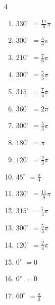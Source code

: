 \begin{multicols}{4}
\begin{enumerate}
  \item $\displaystyle 330^{\circ}$
        $\displaystyle =\frac{11}{6}\pi$

  \item $\displaystyle 300^{\circ}$
        $\displaystyle =\frac{5}{3}\pi$

  \item $\displaystyle 210^{\circ}$
        $\displaystyle =\frac{7}{6}\pi$

  \item $\displaystyle 300^{\circ}$
        $\displaystyle =\frac{5}{3}\pi$

\columnbreak %

  \item $\displaystyle 315^{\circ}$
        $\displaystyle =\frac{7}{4}\pi$

  \item $\displaystyle 360^{\circ}$
        $\displaystyle =2\pi$

  \item $\displaystyle 300^{\circ}$
        $\displaystyle =\frac{5}{3}\pi$

  \item $\displaystyle 180^{\circ}$
        $\displaystyle =\pi$

  \item $\displaystyle 120^{\circ}$
        $\displaystyle =\frac{2}{3}\pi$

  \item $\displaystyle 45^{\circ}$
        $\displaystyle =\frac{\pi}{4}$

  \item $\displaystyle 330^{\circ}$
        $\displaystyle =\frac{11}{6}\pi$

  \item $\displaystyle 315^{\circ}$
        $\displaystyle =\frac{7}{4}\pi$

  \item $\displaystyle 300^{\circ}$
        $\displaystyle =\frac{5}{3}\pi$

  \item $\displaystyle 120^{\circ}$
        $\displaystyle =\frac{2}{3}\pi$

  \item $\displaystyle 0^{\circ}$
        $\displaystyle =0$

  \item $\displaystyle 0^{\circ}$
        $\displaystyle =0$

  \item $\displaystyle 60^{\circ}$
        $\displaystyle =\frac{\pi}{3}$


\end{enumerate}
\end{multicols}
